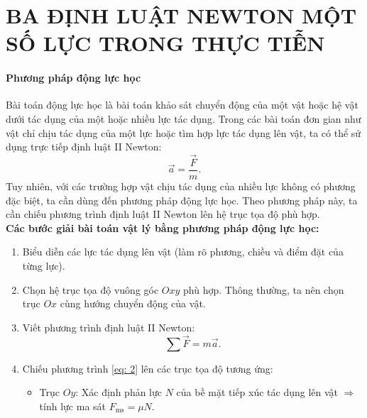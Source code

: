 \chapter[BA ĐỊNH LUẬT NEWTON - MỘT SỐ LỰC TRONG THỰC TIỄN]{BA ĐỊNH LUẬT NEWTON \break MỘT SỐ LỰC TRONG THỰC TIỄN}
\setcounter{section}{10}
\renewcommand{\theequation}{\arabic{equation}}
\begin{tomtat}
	\subsubsection{Phương pháp động lực học}
Bài toán động lực học là bài toán khảo sát chuyển động của một vật hoặc hệ vật dưới tác dụng của một hoặc nhiều lực tác dụng. Trong các bài toán đơn gian như vật chỉ chịu tác dụng của một lực hoặc tìm hợp lực tác dụng lên vật, ta có thể sử dụng trực tiếp định luật II Newton:
\begin{equation}
	\vec{a}=\dfrac{\vec{F}}{m}.
\end{equation}
Tuy nhiên, với các trường hợp vật chịu tác dụng của nhiều lực không có phương đặc biệt, ta cần dùng đến phương pháp động lực học. Theo phương pháp này, ta cần chiếu phương trình định luật II Newton lên hệ trục tọa độ phù hợp.\\
\textbf{Các bước giải bài toán vật lý bằng phương pháp động lực học:}
\begin{enumerate}[label=\bfseries Bước \arabic*:, leftmargin=2.5cm]
	\item Biểu diễn các lực tác dụng lên vật (làm rõ phương, chiều và điểm đặt của từng lực).
	\item Chọn hệ trục tọa độ vuông góc $Oxy$ phù hợp. Thông thường, ta nên chọn trục $Ox$ cùng hướng chuyển động của vật.
	\item  Viết phương trình định luật II Newton: 
	\begin{equation}
		\label{eq: 2}
		\sum \vec{F}=m\vec{a}.
	\end{equation}
	\item Chiếu phương trình \eqref{eq: 2} lên các trục tọa độ tương ứng:
	\begin{itemize}
		\item Trục $Oy$: Xác định phản lực $N$ của bề mặt tiếp xúc tác dụng lên vật $\Rightarrow$ tính lực ma sát $F_{\text{ms}}=\mu N$.

\end{itemize}
\end{enumerate}
\end{tomtat}
